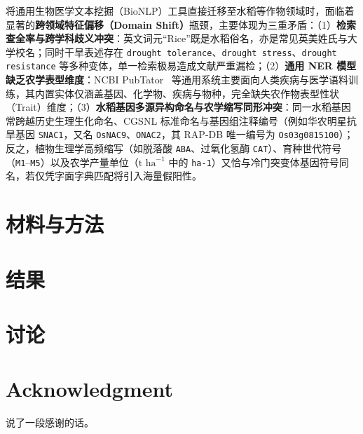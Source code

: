 \documentclass[conference]{IEEEtran}
\begin{document}
将通用生物医学文本挖掘（BioNLP）工具直接迁移至水稻等作物领域时，面临着显著的\textbf{跨领域特征偏移（Domain Shift）}瓶颈，主要体现为三重矛盾：（1）\textbf{检索查全率与跨学科歧义冲突}：英文词元“Rice”既是水稻俗名，亦是常见英美姓氏与大学校名；同时干旱表述存在 \texttt{drought tolerance}、\texttt{drought stress}、\texttt{drought resistance} 等多种变体，单一检索极易造成文献严重漏检；（2）\textbf{通用 NER 模型缺乏农学表型维度}：NCBI PubTator~\cite{wei2024pubtator3} 等通用系统主要面向人类疾病与医学语料训练，其内置实体仅涵盖基因、化学物、疾病与物种，完全缺失农作物表型性状（Trait）维度；（3）\textbf{水稻基因多源异构命名与农学缩写同形冲突}：同一水稻基因常跨越历史生理生化命名、CGSNL 标准命名与基因组注释编号（例如华农明星抗旱基因 \texttt{SNAC1}，又名 \texttt{OsNAC9}、\texttt{ONAC2}，其 RAP-DB 唯一编号为 \texttt{Os03g0815100}）；反之，植物生理学高频缩写（如脱落酸 \texttt{ABA}、过氧化氢酶 \texttt{CAT}）、育种世代符号（\texttt{M1}--\texttt{M5}）以及农学产量单位（$\text{t ha}^{-1}$ 中的 \texttt{ha-1}）又恰与冷门突变体基因符号同名，若仅凭字面字典匹配将引入海量假阳性。

\section{材料与方法}


\section{结果}


\section{讨论}


\section*{Acknowledgment}
{\small 说了一段感谢的话。}
\end{document}
